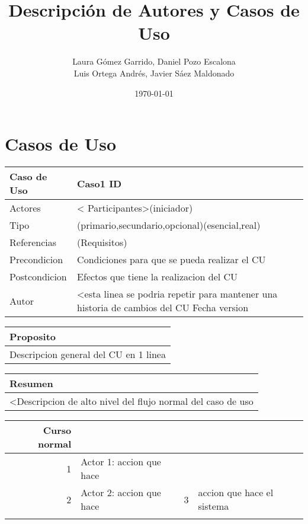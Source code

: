 \documentclass[11pt]{article}
\author{Laura Gómez Garrido, Daniel Pozo Escalona\\
Luis Ortega Andrés, Javier Sáez Maldonado}
\date{\today}
\title{Descripción de Autores y Casos de Uso}
\begin{document}
\maketitle
\tableofcontents




\section{Casos de Uso}
\label{sec:org46092c4}

\begin{center}
\begin{tabular}{ll}
\hline
Caso de Uso & Caso1                  \vline ID\\
\hline
Actores & < Participantes>(iniciador)\\
\hline
Tipo & (primario,secundario,opcional)(esencial,real)\\
\hline
Referencias & (Requisitos)\\
\hline
Precondicion & Condiciones para que se pueda realizar el CU\\
\hline
Postcondicion & Efectos que tiene la realizacion del CU\\
\hline
Autor & <esta linea se podria repetir para mantener una historia de cambios del CU \vline Fecha \vline version \vline\\
\hline
\end{tabular}
\end{center}


\begin{center}
\begin{tabular}{l}
\hline
Proposito\\
\hline
Descripcion general del CU en 1 linea\\
\hline
\end{tabular}
\end{center}


\begin{center}
\begin{tabular}{l}
\hline
Resumen\\
\hline
<Descripcion de alto nivel del flujo normal del caso de uso\\
\hline
\end{tabular}
\end{center}

\begin{center}
\begin{tabular}{rlrl}
\hline
Curso normal &  &  & \\
\hline
1 & Actor 1: accion que hace &  & \\
\hline
2 & Actor 2: accion que hace & 3 & accion que hace el sistema\\
\hline
 &  &  & \\
\hline
\end{tabular}
\end{center}
\end{document}
